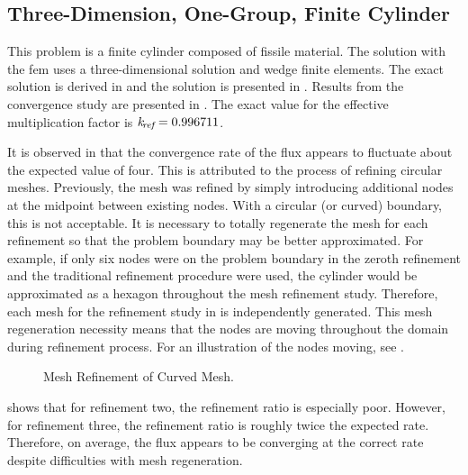   \subsection{Three-Dimension, One-Group, Finite Cylinder}
    This problem is a finite cylinder composed of fissile material.  The
    solution with the \gls{fem} uses a three-dimensional solution and wedge
    finite elements. The exact solution is derived in
     and the solution is presented in
    . Results from the convergence study are
    presented in . The exact value for the effective
    multiplication factor is $k_{\!\mbox{\scriptsize \em ref}} = 0.996711$. 
    
    It is observed in  that the convergence rate of the
    flux appears to fluctuate about the expected value of four. This is
    attributed to the process of refining circular meshes. Previously, the mesh
    was refined by simply introducing additional nodes at the midpoint between
    existing nodes. With a circular (or curved) boundary, this is not
    acceptable. It is necessary to totally regenerate the mesh for each
    refinement so that the problem boundary may be better approximated.  For
    example, if only six nodes were on the problem boundary in the zeroth
    refinement and the traditional refinement procedure were used, the cylinder
    would be approximated as a hexagon throughout the mesh refinement study.
    Therefore, each mesh for the refinement study in  is
    independently generated. This mesh regeneration necessity means that the
    nodes are moving throughout the domain during refinement process. For an
    illustration of the nodes moving, see .

    \begin{figure}
      \centering
      \vspace{0.2in}
      \caption{Mesh Refinement of Curved Mesh.}
      \label{fig:ch03_circle_meshes}
    \end{figure}
    
     shows that for refinement two, the refinement ratio is
    especially poor. However, for refinement three, the refinement ratio is
    roughly twice the expected rate.  Therefore, on average, the flux appears to
    be converging at the correct rate despite difficulties with mesh
    regeneration.

